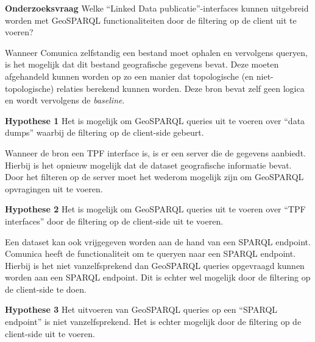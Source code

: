 \textbf{Onderzoeksvraag} Welke “Linked Data publicatie”-interfaces kunnen uitgebreid worden met GeoSPARQL functionaliteiten door de filtering op de client uit te voeren?

Wanneer Comunica zelfstandig een bestand moet ophalen en vervolgens queryen, is het mogelijk dat dit bestand geografische gegevens bevat. Deze moeten afgehandeld kunnen worden op zo een manier dat topologische (en niet-topologische) relaties berekend kunnen worden. Deze bron bevat zelf geen logica en wordt vervolgens de \textit{baseline}.

\textbf{Hypothese 1} Het is mogelijk om GeoSPARQL queries uit te voeren over ``data dumps'' waarbij de filtering op de client-side gebeurt.

Wanneer de bron een TPF interface is, is er een server die de gegevens aanbiedt. Hierbij is het opnieuw mogelijk dat de dataset geografische informatie bevat. Door het filteren op de server moet het wederom mogelijk zijn om GeoSPARQL opvragingen uit te voeren.

\textbf{Hypothese 2} Het is mogelijk om GeoSPARQL queries uit te voeren over ``TPF interfaces'' door de filtering op de client-side uit te voeren.

Een dataset kan ook vrijgegeven worden aan de hand van een SPARQL endpoint. Comunica heeft de functionaliteit om te queryen naar een SPARQL endpoint. Hierbij is het niet vanzelfsprekend dan GeoSPARQL queries opgevraagd kunnen worden aan een SPARQL endpoint. Dit is echter wel mogelijk door de filtering op de client-side te doen.

\textbf{Hypothese 3} Het uitvoeren van GeoSPARQL queries op een ``SPARQL endpoint'' is niet vanzelfsprekend. Het is echter mogelijk door de filtering op de client-side uit te voeren.

